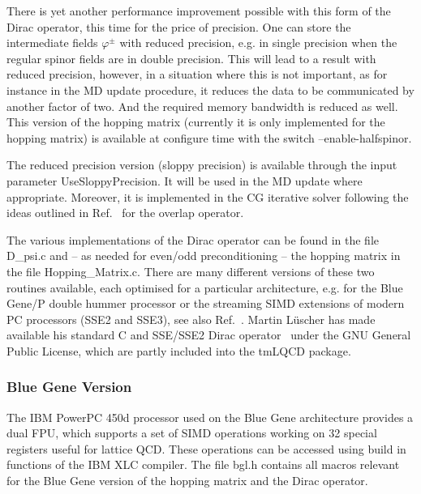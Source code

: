 There is yet another performance improvement possible with this form
of the Dirac operator, this time for the price of precision. One can
store the intermediate fields $\varphi^\pm$ with reduced precision,
e.g. in single precision when the regular spinor fields are in double
precision. This will lead to a result with reduced precision, however,
in a situation where this is not important, as for instance in the MD
update procedure, it reduces the data to be communicated by another
factor of two. And the required memory bandwidth is reduced as well.
This version of the hopping matrix (currently it is only implemented
for the hopping matrix) is available at configure time with the switch
{\ttfamily --enable-halfspinor}. 

The reduced precision version (sloppy precision) is available through
the input parameter {\ttfamily UseSloppyPrecision}. It will be used in
the MD update where appropriate. Moreover, it is implemented in the CG
iterative solver following the ideas outlined in
Ref.~\cite{Chiarappa:2006hz} for the overlap operator.

The various implementations of the Dirac operator can be found in the
file {\ttfamily D\_psi.c} and -- as needed for even/odd
preconditioning -- the hopping matrix in the file {\ttfamily
  Hopping\_Matrix.c}. There are many different versions of these two
routines available, each optimised for a particular architecture,
e.g. for the Blue Gene/P double hummer processor or the streaming SIMD
extensions of modern PC processors (SSE2 and SSE3), see also
Ref.~\cite{Luscher:2001tx}. Martin L{\"u}scher has made available his
standard C and SSE/SSE2 Dirac operator~\cite{Luscher:sse} under the
GNU General Public License, which are partly included into the tmLQCD
package.

\subsubsection{Blue Gene Version}

The IBM PowerPC 450d processor used on the Blue Gene architecture
provides a dual FPU, which supports a set of SIMD operations working
on 32 special registers useful for lattice QCD. These operations can
be accessed using build in functions of the IBM XLC compiler.
The file {\ttfamily bgl.h} contains all macros relevant for the Blue
Gene version of the hopping matrix and the Dirac operator. 

